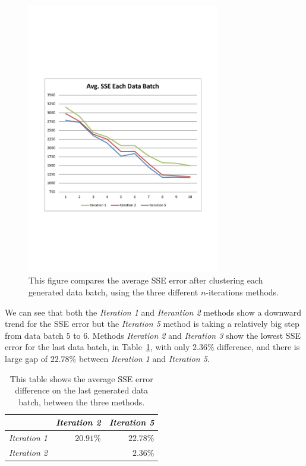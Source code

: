 \begin{figure}[ht]
\centering
\includegraphics[trim = 10mm 70mm 10mm 80mm, clip, width=0.75\textwidth]{Figures/experiments/gen_AvgSSEEachDataBatch.pdf}
\caption{This figure compares the average SSE error after clustering each generated data batch, using the three different $n$-iterations methods. }
\label{fig:results_gen_AvgSSEEachDataBatch}
\end{figure}

We can see that both the \textit{Iteration 1} and \textit{Iterantion 2} methods show a downward trend for the SSE error but the \textit{Iteration 5} method is taking a relatively big step from data batch $5$ to $6$. Methods \textit{Iteration 2} and \textit{Iteration 3} show the lowest SSE error for the last data batch, in Table~\ref{tab:results_gen_avgSSEeachDataBatch}, with only $2.36\%$ difference, and there is large gap of $22.78\%$ between \textit{Iteration 1} and \textit{Iteration 5}.

\begin{table}[h]
\centering
\begin{tabular}{| l | r | r |}
    \hline
    & \textit{Iteration 2} & \textit{Iteration 5} \\ \hline
    \textit{Iteration 1} & $20.91\%$ & $22.78\%$  \\ \hline
    \textit{Iteration 2} & & $2.36\%$ \\ \hline
\end{tabular}
\caption{This table shows the average SSE error difference on the last generated data batch, between the three methods.}
\label{tab:results_gen_avgSSEeachDataBatch}
\end{table}

